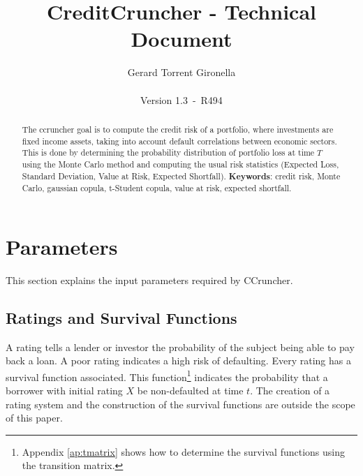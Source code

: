 \documentclass[a4paper,12pt,final]{article}
\def\numversion{1.3}
\def\svnversion{R494}
\begin{document}
\title{CreditCruncher - Technical Document}
\author{Gerard Torrent Gironella\\\\Version \numversion\ -\ \svnversion}
\date{}
\maketitle


\begin{abstract}
The ccruncher goal is to compute the credit risk of a portfolio, where 
investments are fixed income assets, taking into account default correlations
between economic sectors. This is done by determining the probability distribution 
of portfolio loss at time $T$ using the Monte Carlo method and computing the
usual risk statistics (Expected Loss, Standard Deviation, Value at Risk, Expected 
Shortfall).
\newline
\newline
\textbf{Keywords}: credit risk, Monte Carlo, gaussian copula, t-Student copula,
value at risk, expected shortfall.
\end{abstract}
\newpage


\tableofcontents
\newpage


\section{Parameters}

This section explains the input parameters required by CCruncher.

\subsection{Ratings and Survival Functions}
A rating tells a lender or investor the probability of the subject being 
able to pay back a loan. A poor rating indicates a high risk of defaulting.
Every rating has a survival function associated. This function\footnote{
Appendix \ref{ap:tmatrix} shows how to determine the survival functions 
using the transition matrix.} indicates the probability that a borrower with 
initial rating $X$ be non-defaulted at time $t$. The creation of a rating 
system and the construction of the survival functions are outside the scope 
of this paper.
\end{document}
